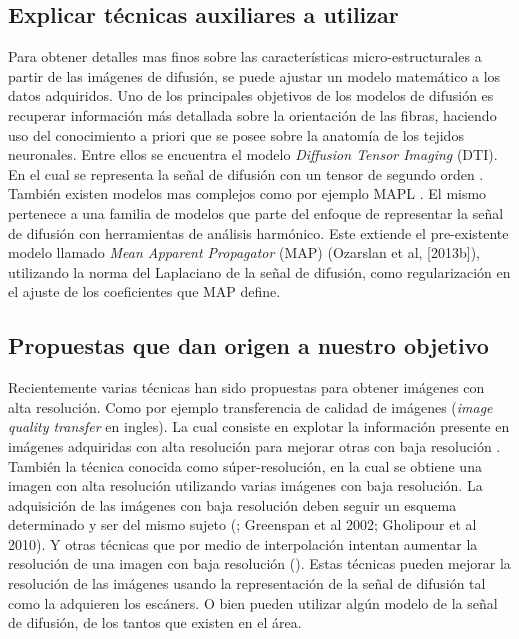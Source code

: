 \documentclass[a4paper,10pt]{article}
\begin{document}
\subsection{Explicar técnicas auxiliares a utilizar}
Para obtener detalles mas finos sobre las características micro-estructurales a partir de las imágenes de difusión, se 
puede ajustar un modelo matemático a los datos adquiridos. Uno de los principales objetivos de los modelos de difusión 
es recuperar información más detallada sobre la orientación de las fibras, haciendo uso del 
conocimiento a priori que se posee sobre la anatomía de los tejidos neuronales. Entre ellos se 
encuentra el modelo \textit{Diffusion Tensor Imaging} (DTI). En el cual se representa la 
se\~nal de difusión con un tensor de segundo orden \citep{Basser1994}. También existen modelos mas 
complejos como por ejemplo MAPL \citep{Fick2016365}. El mismo pertenece a una familia de modelos que parte del enfoque 
de representar la señal de difusión con herramientas de análisis harmónico.
Este extiende el pre-existente modelo llamado \textit{Mean Apparent Propagator} (MAP) (Ozarslan et al, [2013b]), 
utilizando la norma del Laplaciano de la se\~nal de difusión, como regularizaci\'on en el ajuste de los coeficientes 
que MAP define. 


\subsection{Propuestas que dan origen a nuestro objetivo}
Recientemente varias técnicas han sido propuestas para obtener imágenes con alta resolución. Como 
por ejemplo 
transferencia de calidad de imágenes (\textit{image quality transfer} en ingles). La cual 
consiste en explotar la 
información presente en imágenes adquiridas con alta resolución para mejorar otras con baja resolución 
\citep{Alexander2014}. También la técnica conocida como súper-resolución, en 
la cual se obtiene una imagen con alta resolución utilizando varias imágenes con baja resolución. 
La adquisición de las imágenes con baja 
resolución deben seguir un esquema determinado y ser del mismo sujeto (\cite{Irani1993,Robinson2010}; Greenspan et al 
2002; Gholipour et al 2010). Y otras técnicas que por medio de interpolación 
intentan aumentar la resolución de una imagen con baja resolución (\cite{Manjon2010}). Estas técnicas pueden mejorar la 
resolución de las imágenes usando la representación de la señal de difusión tal como la adquieren los escáners. O bien 
pueden utilizar algún modelo de la señal de difusión, de los tantos que existen en el área.
\end{document}
